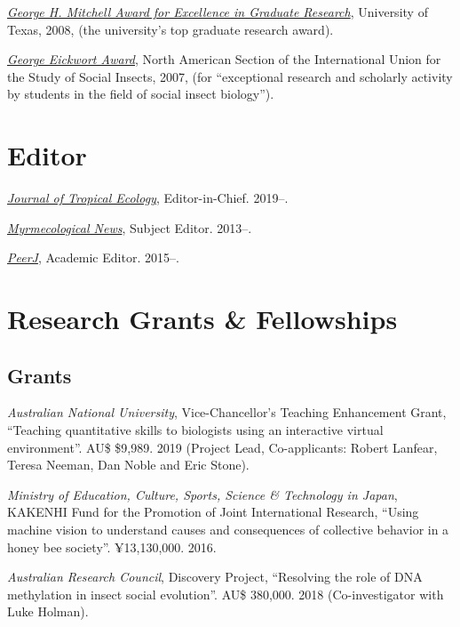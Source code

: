 \documentclass[11pt]{article}
\def\printdate#1{\xprintdate#1-}
\def\xprintdate#1-#2-#3-{#1}
\begin{document}
\ind \textit{\href{https://news.utexas.edu/2008/05/29/graduate-students-honored-for-excellence}{George H. Mitchell Award for Excellence in Graduate Research}}, University of Texas, 2008, (the university's top graduate research award).

\ind \textit{\href{http://iussi.cyberbee.net/wp-content/uploads/2010/04/2007\_Fall\_NAS-IUSSI\_Newsletter.pdf}{George Eickwort Award}}, North American Section of the International Union for the Study of
Social Insects, 2007, (for ``exceptional research and scholarly activity by students in the
field of social insect biology'').


\section{Editor}

\ind \textit{\href{https://mc.manuscriptcentral.com/jte}{Journal of Tropical Ecology}}, Editor-in-Chief. \printdate{2019-07-01}--.

\ind \textit{\href{http://openlogicproject.org/}{Myrmecological News}}, Subject Editor. \printdate{2013-00-00}--.

\ind \textit{\href{https://peerj.com/sasha/}{PeerJ}}, Academic Editor. \printdate{2015-00-00}--.


\section{Research Grants \& Fellowships}

\subsection{Grants}
\ind \textit{Australian National University}, Vice-Chancellor's Teaching Enhancement Grant, ``Teaching quantitative skills to biologists using an interactive virtual
environment''.  AU\$ \$9,989. 2019 (Project Lead, Co-applicants: Robert Lanfear, Teresa Neeman, Dan Noble
and Eric Stone).


\ind \textit{Ministry of Education, Culture, Sports, Science \& Technology in Japan}, KAKENHI Fund for the Promotion of Joint International Research, ``Using machine vision to understand causes and consequences of collective
behavior in a honey bee society''.  ¥13,130,000. 2016.



\ind \textit{Australian Research Council}, Discovery Project, ``Resolving the role of DNA methylation in insect social evolution''.  AU\$ 380,000. 2018 (Co-investigator with Luke Holman).
\end{document}
